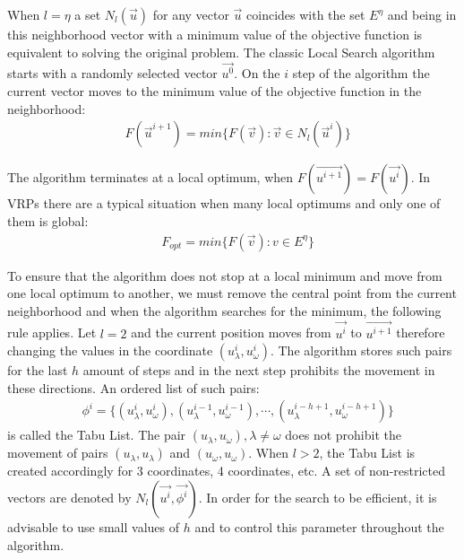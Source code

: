 \documentclass[]{TAACpaper}
\begin{document}
When $l=\eta$ a set $ N_l(\vec{u})$ for any vector $\vec{u}$ coincides with the set $E^{\eta}$ and being in this neighborhood vector with a minimum value of the objective function is equivalent to solving the original problem. The classic Local Search algorithm starts with a randomly selected vector $\vec{u^0}$.
On the $i$ step of the algorithm the current vector moves to the minimum value of the objective function in the neighborhood:
\begin{align} 
& F(\vec{u}^{i+1})=min\{F(\vec{v}):\vec{v} \in N_l(\vec{u}^i)\}
\end{align}	

The algorithm terminates at a local optimum, when $F(\vec{u^{i+1}})=F(\vec{u^i})$. In VRPs there are a typical situation when many local optimums and only one of them is global:
\begin{align} 
& F_{opt}=min\{F(\vec{v}):v \in E^{\eta}\}
\end{align}	

To ensure that the algorithm does not stop at a local minimum and move from one local optimum to another, we must remove the central point  from the current neighborhood and when the algorithm searches for the minimum, the following rule applies. Let $l=2$ and the current position moves from $\vec{u^{i}}$ to $\vec{u^{i+1}}$ therefore changing the values in the coordinate $(u_\lambda^{i}, u_\omega^{i})$. The algorithm stores such pairs for the last $h$ amount of steps and in the next step prohibits the movement in these directions. An ordered list of such pairs:
\begin{align} 
& \phi^i=\{(u_\lambda^{i},u_\omega^{i}),(u_\lambda^{i-1},u_\omega^{i-1}),\cdots,(u_\lambda^{i-h+1},u_\omega^{i-h+1}) \} 
\end{align}	
is called the Tabu List. The pair $(u_\lambda,u_\omega),\lambda \ne \omega$ does not prohibit the movement of pairs $(u_\lambda,u_\lambda)$ and $(u_\omega,u_\omega)$. When $l > 2$, the Tabu List is created accordingly for 3 coordinates, 4 coordinates, etc. A set of non-restricted vectors are denoted by $N_l(\vec{u^i},\vec{\phi^i})$. In order for the search to be efficient, it is advisable to use small values of $h$ and to control this parameter throughout the algorithm.
\end{document}
